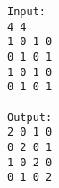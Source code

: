 \begin{verbatim}
Input:
4 4
1 0 1 0
0 1 0 1
1 0 1 0
0 1 0 1

Output:
2 0 1 0
0 2 0 1
1 0 2 0
0 1 0 2

\end{verbatim}